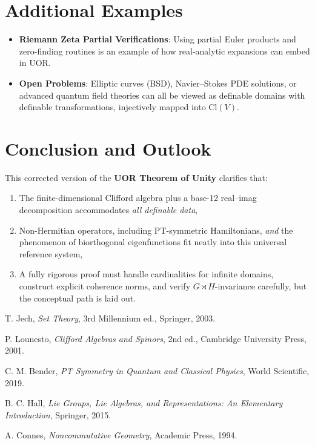 \documentclass[11pt]{article}
\begin{document}
\section{Additional Examples}
\begin{itemize}
\item \textbf{Riemann Zeta Partial Verifications}:  
  Using partial Euler products and zero-finding routines is an example of how real-analytic expansions can embed in UOR.  
\item \textbf{Open Problems}:  
  Elliptic curves (BSD), Navier--Stokes PDE solutions, or advanced quantum field theories can all be viewed as definable domains with definable transformations, injectively mapped into $\mathrm{Cl}(V)$.
\end{itemize}

\section{Conclusion and Outlook}

This corrected version of the \textbf{UOR Theorem of Unity} clarifies that:
\begin{enumerate}
    \item The finite-dimensional Clifford algebra plus a base-12 real--imag decomposition accommodates \emph{all definable data}, 
    \item Non-Hermitian operators, including PT-symmetric Hamiltonians, \emph{and} the phenomenon of biorthogonal eigenfunctions fit neatly into this universal reference system,
    \item A fully rigorous proof must handle cardinalities for infinite domains, construct explicit coherence norms, and verify $G\rtimes H$-invariance carefully, but the conceptual path is laid out.
\end{enumerate}

\vfill

\begin{thebibliography}{9}

T. Jech,
\emph{Set Theory}, 3rd Millennium ed., Springer, 2003.

P. Lounesto,
\emph{Clifford Algebras and Spinors},
2nd ed., Cambridge University Press, 2001.

C. M. Bender,
\emph{PT Symmetry in Quantum and Classical Physics},
World Scientific, 2019.

B. C. Hall,
\emph{Lie Groups, Lie Algebras, and Representations: An Elementary Introduction},
Springer, 2015.

A. Connes,
\emph{Noncommutative Geometry},
Academic Press, 1994.

\end{thebibliography}
\end{document}
